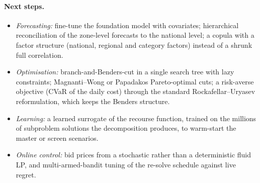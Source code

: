 \paragraph{Next steps.}
\begin{itemize}
  \item \emph{Forecasting:} fine-tune the foundation model with covariates; hierarchical reconciliation of the zone-level forecasts to the national level; a copula with a factor structure (national, regional and category factors) instead of a shrunk full correlation.
  \item \emph{Optimisation:} branch-and-Benders-cut in a single search tree with lazy constraints; Magnanti--Wong or Papadakos Pareto-optimal cuts; a risk-averse objective (CVaR of the daily cost) through the standard Rockafellar--Uryasev reformulation, which keeps the Benders structure.
  \item \emph{Learning:} a learned surrogate of the recourse function, trained on the millions of subproblem solutions the decomposition produces, to warm-start the master or screen scenarios.
  \item \emph{Online control:} bid prices from a stochastic rather than a deterministic fluid LP, and multi-armed-bandit tuning of the re-solve schedule against live regret.
\end{itemize}
